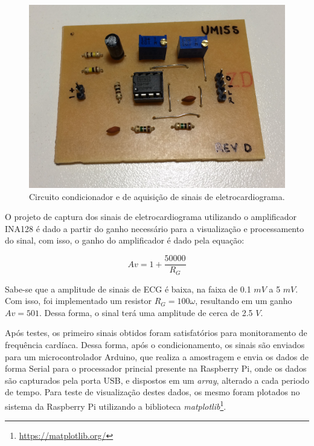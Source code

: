 \begin{figure}[h!]
    \begin{center}
        \includegraphics[scale=0.1]{figuras/ecg_circ.jpg}
    \end{center}
    \caption{Circuito condicionador e de aquisição de sinais de eletrocardiograma.}
    \label{fig:ecg_ele}
\end{figure}

O projeto de captura dos sinais de eletrocardiograma utilizando o amplificador INA128
é dado a partir do ganho necessário para a visualização e processamento do sinal, com isso,
o ganho do amplificador é dado pela equação:

\begin{equation}
  Av = 1 + \frac{50000}{R_{G}}
\end{equation}

Sabe-se que a amplitude de sinais de ECG é baixa, na faixa de 0.1 $mV$ a 5 $mV$.
Com isso, foi implementado um resistor $R_{G} = 100 \omega$, resultando em um ganho
$Av = 501$. Dessa forma, o sinal terá uma amplitude de cerca de 2.5 $V$.

Após testes, os primeiro sinais obtidos foram satisfatórios para monitoramento de frequência
cardíaca. Dessa forma, após o condicionamento, os sinais são enviados para um microcontrolador Arduino,
que realiza a amostragem e envia os dados de forma Serial para o processador princial presente na
Raspberry Pi, onde os dados são capturados pela porta USB, e dispostos em um \textit{array}, alterado
a cada periodo de tempo. Para teste de visualização destes dados, os mesmo foram plotados no sistema
da Raspberry Pi utilizando a biblioteca \textit{matplotlib}\footnote{\url{https://matplotlib.org/}}.

